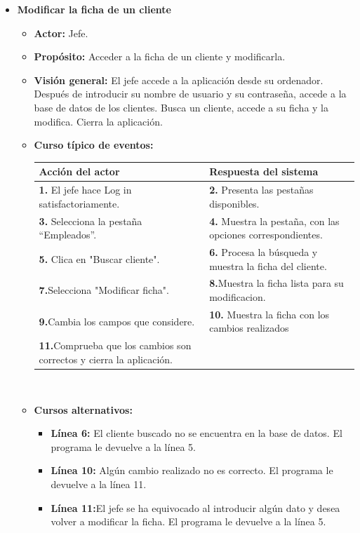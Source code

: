\documentclass[spanish,a4paper,12pt]{report}		%
\begin{document}
\begin{itemize}

	\item \textbf{Modificar la ficha de un cliente}		
			\begin{itemize}
			\item \textbf{Actor:} Jefe.
			\item \textbf{Propósito: } Acceder a la ficha de un cliente y modificarla.
			\item \textbf{Visión general:} El jefe accede a la aplicación desde su ordenador. Después de introducir su nombre de usuario y su contraseña, accede a la base de datos de los clientes. Busca un cliente, accede a su ficha y la modifica. Cierra la aplicación. 
			\item \textbf{Curso típico de eventos:} 	\\
				\begin{tabular}{|p{6cm}||p{6cm}|}
				\hline
				\textbf{Acción del actor} & \textbf{Respuesta del sistema} \\ \hline \hline
				\textbf{1.}   El jefe hace Log in satisfactoriamente. & \textbf{2.} Presenta las pestañas disponibles.\\ \hline
				\textbf{3.} Selecciona la pestaña “Empleados”. & \textbf{4.} Muestra la pestaña, con las opciones correspondientes. \\ \hline
				\textbf{5.} Clica en "Buscar cliente".	& \textbf{6.} Procesa la búsqueda y muestra la ficha del cliente. \\ \hline
				\textbf{7.}Selecciona "Modificar ficha". & \textbf{8.}Muestra la ficha lista para su modificacion.\\ \hline
				\textbf{9.}Cambia los campos que considere. & \textbf{10.} Muestra la ficha con los cambios realizados \\ \hline
				\textbf{11.}Comprueba que los cambios son correctos y cierra la aplicación. & \textbf{} \\ \hline
			\end{tabular}
			\\
			\item \textbf{Cursos alternativos:} 
			\begin{itemize}
			\item  \textbf{Línea 6:} El cliente buscado no se encuentra en la base de datos. El programa le devuelve a la línea 5.
			\item  \textbf{Línea 10:} Algún cambio realizado no es correcto. El programa le devuelve a la línea 11.
			\item  \textbf{Línea 11:}El jefe se ha equivocado al introducir algún dato y desea volver a modificar la ficha. El programa le devuelve a la línea 5.
			

\end{itemize}
\end{itemize}
\end{itemize}
\end{document}
